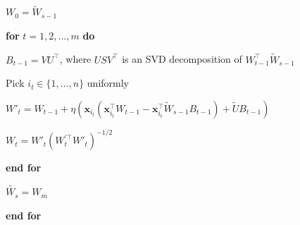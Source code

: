 \documentclass{article}
\begin{document}
    \quad$W_0 = \tilde{W}_{s-1}$  
  
        \quad\textbf{for} $t = 1,2,...,m$ \textbf{do}  
        
        \quad\quad\quad $B_{t-1}=VU^\top$, where $USV^\top$ is an SVD decomposition of $W_{t-1}^\top \tilde{W}_{s-1}$
        
        \quad\quad\quad Pick $i_t \in \{1,...,n\}$ uniformly  
            
         \quad\quad\quad $W'_t = W_{t-1}+\eta (\textbf{x}_{i_t}(\textbf{x}^\top_{i_t}W_{t-1}-\textbf{x}^\top_{i_t}\tilde{W}_{s-1}B_{t-1}) + \tilde{U}B_{t-1})$ 

         \quad\quad\quad $W_t = W'_t(W^{'\top}_t W'_t)^{-1/2}$  

     \quad\textbf{end for}  

     \quad$\tilde{W_s} = W_m$  

\textbf{end for}
\end{document}
